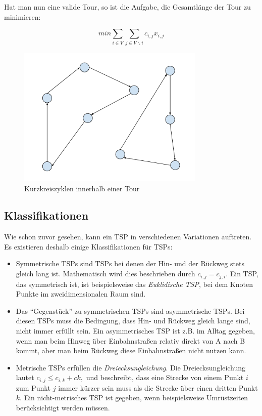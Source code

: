 \documentclass[a4paper, 11pt]{article}
\begin{document}
Hat man nun eine valide Tour, so ist die Aufgabe, die Gesamtlänge der Tour
zu minimieren:

$$min\sum_{i \in V} \sum_{j \in V \backslash i} c_{i,j}x_{i,j}$$

\begin{figure}[p]
    \centering
    \includegraphics[width=0.8\textwidth]{kurzkreiszyklen.png}
    \caption{Kurzkreiszyklen innerhalb einer Tour}
    \label{fig:short_cycles}
\end{figure}

\subsection{Klassifikationen}

Wie schon zuvor gesehen, kann ein TSP in verschiedenen Variationen auftreten.
Es existieren deshalb einige Klassifikationen für TSPs:

\begin{itemize}
  \item Symmetrische TSPs sind TSPs bei denen der Hin- und der Rückweg stets
  gleich lang ist. Mathematisch wird dies beschrieben durch
  $c_{i,j} = c_{j,i}$. Ein TSP, das symmetrisch ist, ist beispielsweise das
  \textit{Euklidische TSP}, bei dem Knoten Punkte im zweidimensionalen Raum
  sind.

  \item Das ``Gegenstück'' zu symmetrischen TSPs sind asymmetrische TSPs.
  Bei diesen TSPs muss die Bedingung, dass Hin- und Rückweg gleich lange
  sind, nicht immer erfüllt sein. Ein asymmetrisches TSP ist z.B. im Alltag
  gegeben, wenn man beim Hinweg über Einbahnstraßen relativ direkt von A
  nach B kommt, aber man beim Rückweg diese Einbahnstraßen nicht nutzen kann.

  \item Metrische TSPs erfüllen die \textit{Dreiecksungleichung}. Die
  Dreiecksungleichung lautet $c_{i,j} \leq c_{i,k} + c{k, }$ und beschreibt,
  dass eine Strecke von einem Punkt $i$ zum Punkt $j$ immer kürzer sein
  muss als die Strecke über einen dritten Punkt $k$. Ein nicht-metrisches
  TSP ist gegeben, wenn beispielsweise Umrüstzeiten berücksichtigt werden
  müssen.
\end{itemize}
\end{document}
